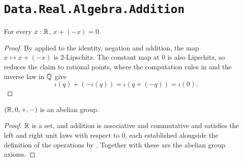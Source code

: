 \section{\texttt{Data.Real.Algebra.Addition}}

\begin{lemma}
  \label{+InvR}
  For every $x : \mathbb{R}$, $x + (-x) = 0$.
\end{lemma}
\begin{proof}
  By  applied to the identity, negation and addition, the map $x \mapsto x + (-x)$ is $2$-Lipschitz. The constant map at $0$ is also Lipschitz, so  reduces the claim to rational points, where the computation rules in  and the inverse law in $\mathbb{Q}$ give
  \[
    \iota(q) + (-\iota(q)) = \iota(q + (-q)) = \iota(0).
  \]
\end{proof}

\begin{corollary}
  \label{RAbGroup}
  $(\mathbb{R}, 0, +, -)$ is an abelian group.
\end{corollary}
\begin{proof}
  $\mathbb{R}$ is a set, and addition is associative and commutative and satisfies the left and right unit laws with respect to $0$, each established alongside the definition of the operations by . Together with  these are the abelian group axioms.
\end{proof}
